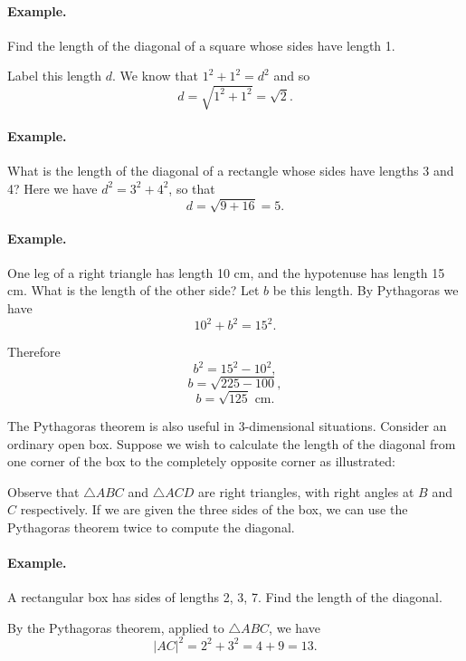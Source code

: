 \documentclass[12pt]{book} %
\begin{document}
\paragraph{Example.}
Find the length of the diagonal of a square whose sides have length 1.


Label this length $d$. We know that $1^2+1^2=d^2$ and so
\[
d=\sqrt{1^2+1^2}=\sqrt{2}.
\]

\paragraph{Example.}
What is the length of the diagonal of a rectangle whose sides have lengths 3 and 4? Here we have $d^2=3^2+4^2$, so that
\[
d=\sqrt{9+16}=5.
\]


\paragraph{Example.}
One leg of a right triangle has length 10 cm, and the hypotenuse has length 15 cm. What is the length of the other side? Let $b$ be this length. By Pythagoras we have
\[
10^2+b^2=15^2.
\]

Therefore
\[
b^2=15^2-10^2,
\]
\[
b=\sqrt{225-100},
\]
\[
b=\sqrt{125}\text{ cm.}
\]


The Pythagoras theorem is also useful in 3-dimensional situations. Consider an ordinary open box. Suppose we wish to calculate the length of the diagonal from one corner of the box to the completely opposite corner as illustrated:


Observe that $\triangle ABC$ and $\triangle ACD$ are right triangles, with right angles at $B$ and $C$ respectively. If we are given the three sides of the box, we can use the Pythagoras theorem twice to compute the diagonal.

\paragraph{Example.}
A rectangular box has sides of lengths 2, 3, 7. Find the length of the diagonal.


By the Pythagoras theorem, applied to $\triangle ABC$, we have
\[
|AC|^2=2^2+3^2=4+9=13.
\]
\end{document}

